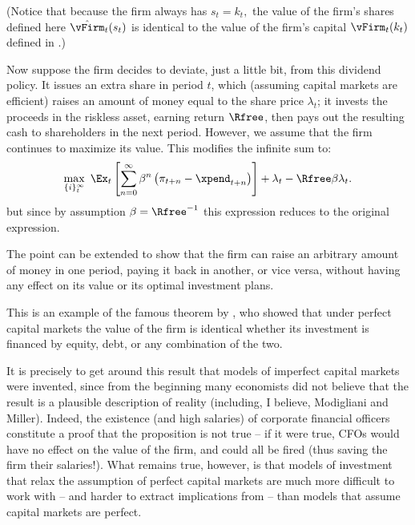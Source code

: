 \documentclass{handout}
\begin{document}
(Notice that because the firm always has $s_{t} = k_{t},$ the value of the firm's shares defined here $\hat{\vFirm}_{t}(s_{t})$ is identical to the value of the firm's capital ${\vFirm}_{t}(k_{t})$ defined in .)

Now suppose the firm decides to deviate, just a little bit, from this
dividend policy.  It issues an extra share in period $t$, which
(assuming capital markets are efficient) raises an amount of money
equal to the share price $\lambda_{t}$; it invests the proceeds in the
riskless asset, earning return $\Rfree$, then pays out the resulting
cash to shareholders in the next period.  However, we assume that the
firm continues to maximize its value.  This modifies the infinite sum
to:
\begin{equation}\begin{gathered}\begin{aligned}
  \max_{\{i\}_{t}^{\infty}}~\Ex_{t}\left[\sum_{n=0}^{\infty} \beta^{n} \left(\pi_{t+n}-\xpend_{t+n}\right)\right]+ \lambda_{t} - \Rfree\beta \lambda_{t}.
\end{aligned}\end{gathered}\end{equation}
but since by assumption $\beta = \Rfree^{-1}$ this expression reduces to the original expression.  

The point can be extended to show that the firm can raise an arbitrary amount of money in one period,
paying it back in another, or vice versa, without having any effect on its value or its optimal 
investment plans.  

This is an example of the famous theorem by \cite{mmTheorem}, who showed that under perfect
capital markets the value of the firm is identical whether its investment is financed by equity, 
debt, or any combination of the two.

It is precisely to get around this result that models of imperfect
capital markets were invented, since from the beginning many
economists did not believe that the result is a plausible description
of reality (including, I believe, Modigliani and Miller).  Indeed, the
existence (and high salaries) of corporate financial officers
constitute a proof that the proposition is not true -- if it were
true, CFOs would have no effect on the value of the firm, and could
all be fired (thus saving the firm their salaries!).  What remains
true, however, is that models of investment that relax the assumption
of perfect capital markets are much more difficult to work with -- and
harder to extract implications from -- than models that assume capital
markets are perfect.
\end{document}
